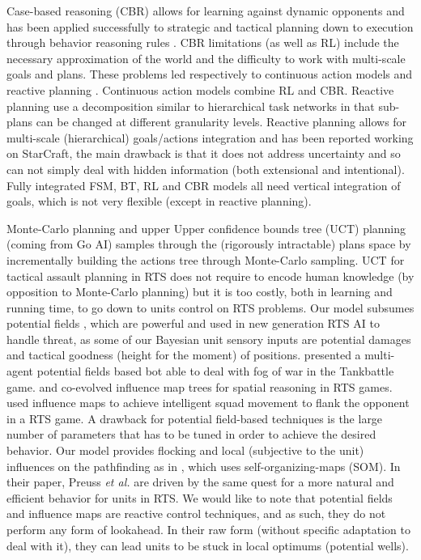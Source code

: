 Case-based reasoning (CBR) allows for learning against dynamic opponents \citep{LTW} and has been applied successfully to strategic and tactical planning down to execution through behavior reasoning rules \citep{Ontanon2007}. CBR limitations (as well as RL) include the necessary approximation of the world and the difficulty to work with multi-scale goals and plans. These problems led respectively to continuous action models \citep{Molineaux08}and reactive planning \citep{WeberCIG10}. Continuous action models combine RL and CBR. Reactive planning use a decomposition similar to hierarchical task networks \citep{HTNPlanning} in that sub-plans can be changed at different granularity levels. Reactive planning allows for multi-scale (hierarchical) goals/actions integration and has been reported working on StarCraft, the main drawback is that it does not address uncertainty and so can not simply deal with hidden information (both extensional and intentional). 
Fully integrated FSM, BT, RL and CBR models all need vertical integration of goals, which is not very flexible (except in reactive planning).

Monte-Carlo planning \citep{Chung05} and upper Upper 
confidence bounds tree (UCT) planning (coming from Go AI) \citep{UCT} 
 samples through the (rigorously intractable) plans space by 
incrementally building the actions tree through Monte-Carlo sampling. 
UCT for tactical assault planning \citep{UCT} in RTS does not require to encode human knowledge (by opposition to Monte-Carlo planning) but it is too costly, both in learning and running time, to go down to units control on RTS problems. 
Our model subsumes potential fields \citep{Hagelback2009}, which are powerful and used in new generation RTS AI to handle threat, as some of our Bayesian unit sensory inputs are potential damages and tactical goodness (height for the moment) of positions. \cite{HagelbackJ08} presented a multi-agent potential fields based bot able to deal with fog of war in the Tankbattle game. \cite{Avery09} and \cite{SmithCIG10} co-evolved influence map trees for spatial reasoning in RTS games. \cite{Danielsiek_2008} used influence maps to achieve intelligent squad movement to flank the opponent in a RTS game. A drawback for potential field-based techniques is the large number of parameters that has to be tuned in order to achieve the desired behavior. 
Our model provides flocking and local (subjective to the unit) influences on the pathfinding as in \citep{teamCompositionRTS}, which uses self-organizing-maps (SOM). In their paper, Preuss \textit{et al.} are driven by the same quest for a more natural and efficient behavior for units in RTS. 
We would like to note that potential fields and influence maps are reactive control techniques, and as such, they do not perform any form of lookahead. In their raw form (without specific adaptation to deal with it), they can lead units to be stuck in local optimums (potential wells). 



